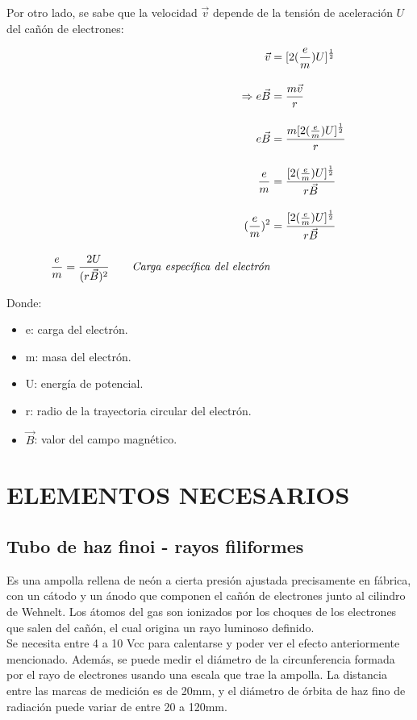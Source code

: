 \documentclass[a4paper]{article}
\begin{document}
    \indent Por otro lado, se sabe que la velocidad $\vec{v}$ depende de la tensión de aceleración $U$ del cañón de electrones:

    \begin{align}
        \vec{v} &= [2 (\frac {e}{m}) U]^{\frac{1}{2}} \tag*{} \\[10pt]
        \Rightarrow e \vec{B} &= \frac{m {\vec{v}}}{r} \tag*{} \\[10pt]
        e \vec{B} &= \frac{m[2 (\frac {e}{m}) U]^{\frac{1}{2}}}{r} \tag*{} \\[10pt]
        \frac{e}{m} &= \frac{[2 (\frac {e}{m}) U]^{\frac{1}{2}}}{r \vec{B}} \tag*{} \\[10pt]
        (\frac{e}{m})^{2} &= \frac{[2 (\frac {e}{m}) U]^{\frac{1}{2}}}{r \vec{B}} \tag*{} \\[10pt]
        \frac{e}{m} = \frac{2 U}{(r \vec{B})^2} \tag*{\textit{Carga específica del electrón}}
    \end{align}

    \indent Donde:
    \begin{itemize}
        \item e: carga del electrón.
        \item m: masa del electrón.
        \item U: energía de potencial.
        \item r: radio de la trayectoria circular del electrón.
        \item $\vec{B}$: valor del campo magnético.
    \end{itemize}

\section{ELEMENTOS NECESARIOS}

        \subsection{Tubo de haz finoi - rayos filiformes}


       \indent Es una ampolla rellena de neón a cierta presión ajustada precisamente en fábrica, con un cátodo y un ánodo que componen el cañón de electrones junto al cilindro de Wehnelt. Los átomos del gas son ionizados por los choques de los electrones que salen del cañón, el cual origina un rayo luminoso definido. \\
       \indent Se necesita entre 4 a 10 Vcc para calentarse y poder ver el efecto anteriormente mencionado. Además, se puede medir el diámetro de la circunferencia formada por el rayo de electrones usando una escala que trae la ampolla. La distancia entre las marcas de medición es de 20mm, y el diámetro de órbita de haz fino de radiación puede variar de entre 20 a 120mm. \\
\end{document}
